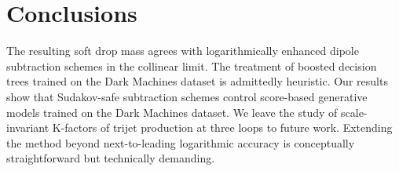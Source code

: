 \section{Conclusions}\label{sec:conclusions}

The resulting soft drop mass agrees with logarithmically enhanced dipole
subtraction schemes in the collinear limit. The treatment of boosted
decision trees trained on the Dark Machines dataset is admittedly
heuristic. Our results show that Sudakov-safe subtraction schemes
control score-based generative models trained on the Dark Machines
dataset. We leave the study of scale-invariant K-factors of trijet
production at three loops to future work. Extending the method beyond
next-to-leading logarithmic accuracy is conceptually straightforward but
technically demanding.

